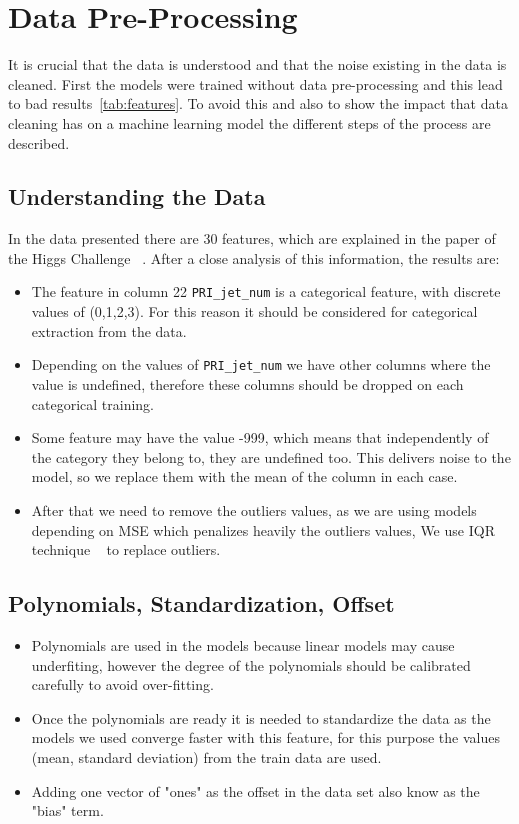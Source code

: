 \documentclass[10pt,conference,compsocconf]{IEEEtran}
\begin{document}
\section{Data Pre-Processing}

\label{sec:Data Pre-Processing}

It is crucial that the data is understood and that the noise existing in the 
data is cleaned. First the models were trained without data pre-processing
and this lead to bad results~\ref{tab:features}. To avoid this and also to 
show the impact that data cleaning has on a machine learning model the different
steps of the process are described.

\subsection{Understanding the Data}
In the data presented there are 30 features, which are explained in 
the paper of the Higgs Challenge ~\cite{higgs_challenge01}. After a 
close analysis of this information, the results are:

\begin{itemize}
 \label{text:categorical}
\item The feature in column 22 \texttt{PRI\_jet\_num} is a categorical feature,
with discrete values of (0,1,2,3). For this reason it should be considered
for categorical extraction from the data.
\item Depending on the values of \texttt{PRI\_jet\_num}  we have other columns
where the value is undefined, therefore these columns should be dropped 
on each categorical training.
\item Some feature may have the value -999, which means that
independently of the category they belong to, they are
undefined too. This delivers
noise to the model, so we replace them with the mean of the column in each
case.
\item After that we need to remove the outliers values, as we are using models
depending on MSE which penalizes heavily the outliers values, We use IQR technique ~\cite{IQR01} to replace outliers.

\end{itemize}

\subsection{Polynomials, Standardization, Offset}
 \label{text:datasteps}
\begin{itemize}
\item Polynomials are used in the models because linear models may cause
underfiting, however the degree of the polynomials should be calibrated carefully
to avoid over-fitting.
\item Once the polynomials are ready it is needed to standardize the data 
as the models we used converge faster with this feature, for this purpose 
the values (mean, standard deviation) from the train data  are used.
\item Adding one vector of "ones" as the offset in the data set also know as the
"bias" term.

\end{itemize}
\end{document}
